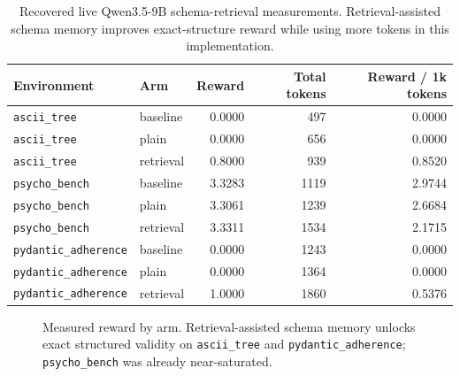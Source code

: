 \documentclass[11pt]{article}
\begin{document}
\begin{table}[t]
\centering
\small
\begin{tabular}{llrrr}
\toprule
Environment & Arm & Reward & Total tokens & Reward / 1k tokens\\
\midrule
\texttt{ascii\_tree} & baseline & 0.0000 & 497 & 0.0000\\
\texttt{ascii\_tree} & plain & 0.0000 & 656 & 0.0000\\
\texttt{ascii\_tree} & retrieval & 0.8000 & 939 & 0.8520\\
\texttt{psycho\_bench} & baseline & 3.3283 & 1119 & 2.9744\\
\texttt{psycho\_bench} & plain & 3.3061 & 1239 & 2.6684\\
\texttt{psycho\_bench} & retrieval & 3.3311 & 1534 & 2.1715\\
\texttt{pydantic\_adherence} & baseline & 0.0000 & 1243 & 0.0000\\
\texttt{pydantic\_adherence} & plain & 0.0000 & 1364 & 0.0000\\
\texttt{pydantic\_adherence} & retrieval & 1.0000 & 1860 & 0.5376\\
\bottomrule
\end{tabular}
\caption{Recovered live Qwen3.5-9B schema-retrieval measurements. Retrieval-assisted schema memory improves exact-structure reward while using more tokens in this implementation.}
\label{tab:measured}
\end{table}

\begin{figure}[t]
\centering
{}
\caption{Measured reward by arm. Retrieval-assisted schema memory unlocks exact structured validity on \texttt{ascii\_tree} and \texttt{pydantic\_adherence}; \texttt{psycho\_bench} was already near-saturated.}
\label{fig:reward}
\end{figure}
\end{document}
